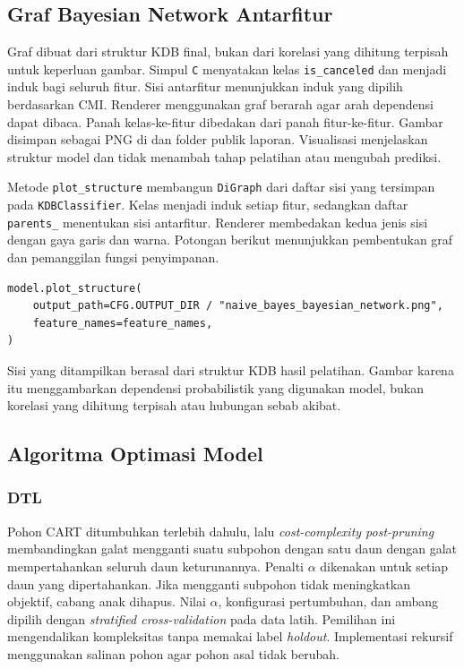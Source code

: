 \subsection{Graf Bayesian Network Antarfitur}

Graf dibuat dari struktur KDB final, bukan dari korelasi yang dihitung
terpisah untuk keperluan gambar. Simpul \texttt{C} menyatakan kelas
\texttt{is\_canceled} dan menjadi induk bagi seluruh fitur. Sisi antarfitur
menunjukkan induk yang dipilih berdasarkan CMI. Renderer menggunakan graf
berarah agar arah dependensi dapat dibaca. Panah kelas-ke-fitur dibedakan
dari panah fitur-ke-fitur. Gambar disimpan sebagai PNG di
 dan folder publik laporan.
Visualisasi menjelaskan struktur model dan tidak menambah tahap pelatihan
atau mengubah prediksi.

Metode \texttt{plot\_structure} membangun \texttt{DiGraph} dari daftar sisi
yang tersimpan pada \texttt{KDBClassifier}. Kelas menjadi induk setiap fitur,
sedangkan daftar \texttt{parents\_} menentukan sisi antarfitur. Renderer
membedakan kedua jenis sisi dengan gaya garis dan warna. Potongan berikut
menunjukkan pembentukan graf dan pemanggilan fungsi penyimpanan.

\begin{lstlisting}[caption={Pembuatan graf dan penyimpanan struktur KDB},label={lst-bonus-bn-graph}]
model.plot_structure(
    output_path=CFG.OUTPUT_DIR / "naive_bayes_bayesian_network.png",
    feature_names=feature_names,
)
\end{lstlisting}

Sisi yang ditampilkan berasal dari struktur KDB hasil pelatihan. Gambar
karena itu menggambarkan dependensi probabilistik yang digunakan model,
bukan korelasi yang dihitung terpisah atau hubungan sebab akibat.

\subsection{Algoritma Optimasi Model}

\subsubsection{DTL}

Pohon CART ditumbuhkan terlebih dahulu, lalu \textit{cost-complexity
    post-pruning} membandingkan galat mengganti suatu subpohon dengan satu daun
dengan galat mempertahankan seluruh daun keturunannya. Penalti
$\alpha$ dikenakan untuk setiap daun yang dipertahankan. Jika mengganti
subpohon tidak meningkatkan objektif, cabang anak dihapus.
Nilai $\alpha$, konfigurasi pertumbuhan, dan ambang dipilih dengan
\textit{stratified cross-validation} pada data latih. Pemilihan ini
mengendalikan kompleksitas tanpa memakai label \textit{holdout}.
Implementasi rekursif menggunakan salinan pohon agar pohon asal tidak
berubah.

